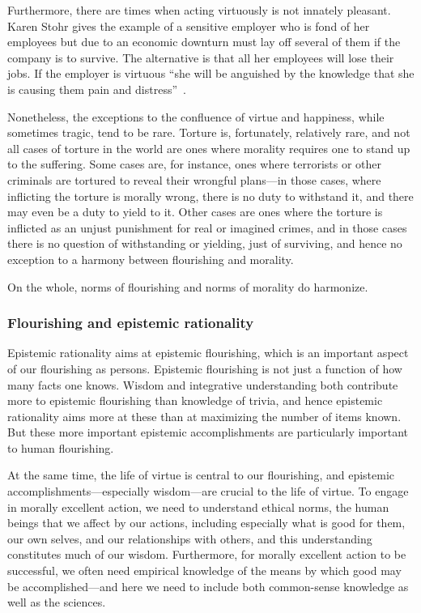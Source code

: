 Furthermore, there are times when acting virtuously is not innately pleasant. Karen Stohr gives the example of
a sensitive employer who is fond of her employees but due to an economic downturn must lay off several of them
if the company is to survive. The alternative is that all her employees will lose their jobs. If the employer
is virtuous ``she will be anguished by the knowledge that she is causing them pain and distress''~\parencite{Stohr2003}.

Nonetheless, the exceptions to the confluence of virtue and happiness, while sometimes tragic, tend to be rare. 
Torture is, fortunately, relatively rare, and not all cases of torture in the world are ones where morality requires 
one to stand up to the suffering. Some cases are, for instance, ones where terrorists or other criminals are tortured
to reveal their wrongful plans---in those cases, where inflicting the torture is morally wrong, there is no duty to 
withstand it, and there may even be a duty to yield to it. Other cases are ones where the torture is inflicted 
as an unjust punishment for real or imagined crimes, and in those cases there is no question of withstanding or 
yielding, just of surviving, and hence no exception to a harmony between flourishing and morality. 

On the whole, norms of flourishing and norms of morality do harmonize.

\subsubsection{Flourishing and epistemic rationality}
Epistemic rationality aims at epistemic flourishing, which is an important aspect of our flourishing as persons.
Epistemic flourishing is not just a function of how many facts one knows. Wisdom and integrative understanding 
both contribute more to epistemic flourishing 
than knowledge of trivia, and hence epistemic rationality aims more at these than at maximizing the number of 
items known. But these more important epistemic accomplishments are particularly important to human 
flourishing.

At the same time, the life of virtue is central to our flourishing, and epistemic accomplishments---especially 
wisdom---are 
crucial to the life of virtue. To engage in morally excellent action, we need to understand ethical norms, the 
human beings that we affect by our actions, including especially what is good for them, our own selves, and our 
relationships with others, and this understanding constitutes much of our wisdom. Furthermore, for morally 
excellent action to be successful, we often need empirical knowledge of the means by which good may 
be accomplished---and here we need to include both common-sense knowledge 
as well as the sciences.


